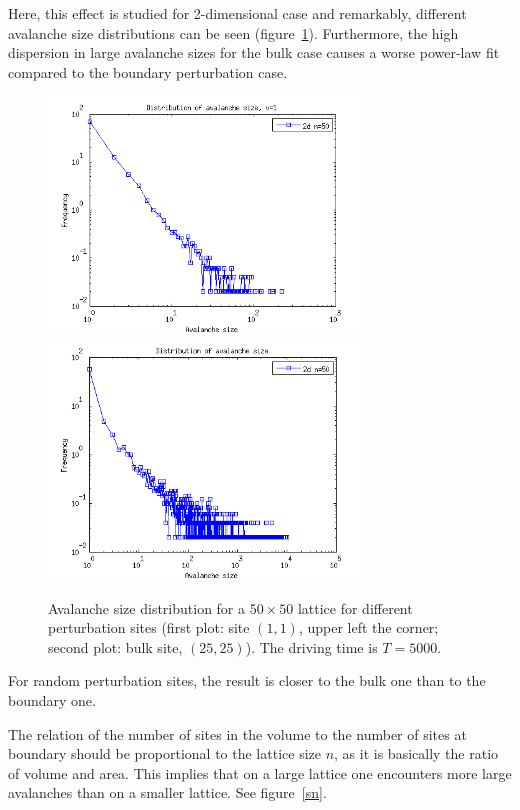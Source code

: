 Here, this effect is studied for 2-dimensional case and remarkably, different avalanche size distributions can be seen (figure~\ref{sv}). Furthermore, the high dispersion in large avalanche sizes for the bulk case causes a worse power-law fit compared to the boundary perturbation case.

\begin{figure} 
\begin{center}
\includegraphics[width=0.75\textwidth]{results/sv1.png}
\includegraphics[width=0.75\textwidth]{results/sbulk.png} 
\caption{Avalanche size distribution for a $50\times50$ lattice for different perturbation sites (first plot: site $(1,1)$, upper left the corner; second plot: bulk site, $(25,25)$). The driving time is $T=5000$.}
\label{sv}
\end{center}
\end{figure} 

For random perturbation sites, the result is closer to the bulk one than to the boundary one.


The relation of the number of sites in the volume to the number of sites at boundary should be proportional to the lattice size $n$, as it is basically the ratio of volume and area. This implies that on a large lattice one encounters more large avalanches than on a smaller lattice. See figure~\ref{sn}.

